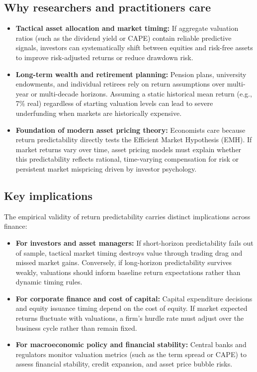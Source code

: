 \subsection{Why researchers and practitioners care}

\begin{itemize}
  \item \textbf{Tactical asset allocation and market timing:} If aggregate valuation ratios (such as the dividend yield or CAPE) contain reliable predictive signals, investors can systematically shift between equities and risk-free assets to improve risk-adjusted returns or reduce drawdown risk.
  \item \textbf{Long-term wealth and retirement planning:} Pension plans, university endowments, and individual retirees rely on return assumptions over multi-year or multi-decade horizons. Assuming a static historical mean return (e.g., 7\% real) regardless of starting valuation levels can lead to severe underfunding when markets are historically expensive.
  \item \textbf{Foundation of modern asset pricing theory:} Economists care because return predictability directly tests the Efficient Market Hypothesis (EMH). If market returns vary over time, asset pricing models must explain whether this predictability reflects rational, time-varying compensation for risk or persistent market mispricing driven by investor psychology.
\end{itemize}

\subsection{Key implications}

The empirical validity of return predictability carries distinct implications across finance:

\begin{itemize}
  \item \textbf{For investors and asset managers:} If short-horizon predictability fails out of sample, tactical market timing destroys value through trading drag and missed market gains. Conversely, if long-horizon predictability survives weakly, valuations should inform baseline return expectations rather than dynamic timing rules.
  \item \textbf{For corporate finance and cost of capital:} Capital expenditure decisions and equity issuance timing depend on the cost of equity. If market expected returns fluctuate with valuations, a firm's hurdle rate must adjust over the business cycle rather than remain fixed.
  \item \textbf{For macroeconomic policy and financial stability:} Central banks and regulators monitor valuation metrics (such as the term spread or CAPE) to assess financial stability, credit expansion, and asset price bubble risks.
\end{itemize}

